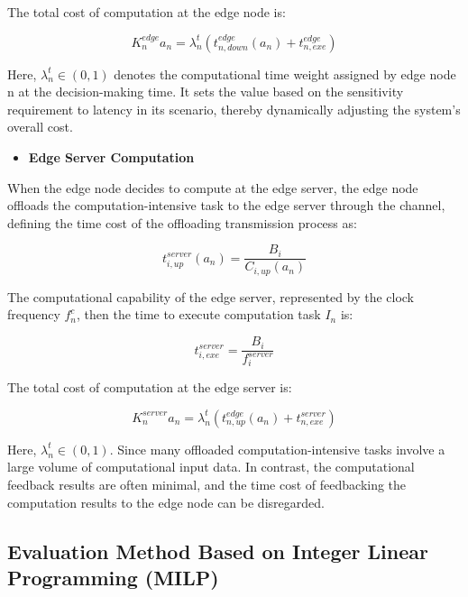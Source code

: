 \documentclass[preprint,12pt]{elsarticle}
\begin{document}
The total cost of computation at the edge node is:

\begin{equation}
    K_n^{edge} {a_n}=\lambda_n^t (t_{n,down}^{edge} (a_n )+t_{n,exe}^{edge} )
\end{equation}


Here, \(\lambda^t_n \in (0,1)\) denotes the computational time weight assigned by edge node n at the decision-making time. It sets the value based on the sensitivity requirement to latency in its scenario, thereby dynamically adjusting the system's overall cost.

\begin{itemize}
    \item {\fontsize{11}{\baselineskip}\selectfont\textbf{Edge Server Computation}}
\end{itemize}

When the edge node decides to compute at the edge server, the edge node offloads the computation-intensive task to the edge server through the channel, defining the time cost of the offloading transmission process as:

\begin{equation}
    t_{i,up}^{server} (a_n )=\frac{B_i}{C_{i,up} (a_n )} 
\end{equation}

The computational capability of the edge server, represented by the clock frequency \(f_n^c\), then the time to execute computation task \(I_n\) is:

\begin{equation}
    t_{i,exe}^{server}=\frac{B_i}{f_i^{server}}
\end{equation}

The total cost of computation at the edge server is:

\begin{equation}
    K_n^{server} {a_n}=\lambda_n^t (t_{n,up}^{edge} (a_n )+t_{n,exe}^{server} )
\end{equation}

Here, \(\lambda_n^t\in(0,1)\). Since many offloaded computation-intensive tasks involve a large volume of computational input data. In contrast, the computational feedback results are often minimal, and the time cost of feedbacking the computation results to the edge node can be disregarded.

\subsection{Evaluation Method Based on Integer Linear Programming (MILP)}
\end{document}
